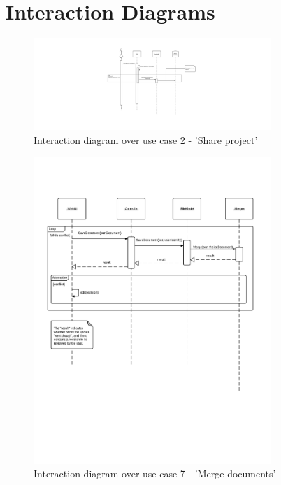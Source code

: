 \section{Interaction Diagrams}
\label{sec:interaction-diagram-appendix}

\begin{figure}[htb]
    \centering
    \includegraphics[width=0.8\textwidth]{Software_design/graphics/usecase2.png}
    \caption{Interaction diagram over use case 2 - 'Share project'}
    \label{fig:uc2-interaction-diagram}
\end{figure}

\begin{figure}[htb]
    \centering
    \includegraphics[width=0.8\textwidth]{Software_design/graphics/usecase7.png}
    \caption{Interaction diagram over use case 7 - 'Merge documents'}
    \label{fig:uc7-interaction-diagram}
\end{figure}
